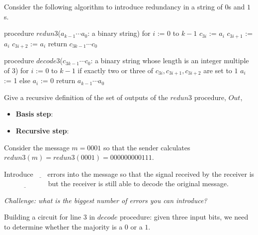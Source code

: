 \documentclass[12pt, oneside]{article}
\begin{document}
\newpage
Consider the following algorithm to introduce redundancy in a string of $0$s and $1$s.
\begin{algorithm}[caption={Create redundancy by repeating each bit three times}]
procedure $\textit{redun3}$($a_{k-1} \cdots a_0$: a binary string)
for $i$ := $0$ to $k-1$
  $c_{3i}$ := $a_i$
  $c_{3i+1}$ := $a_i$
  $c_{3i+2}$ := $a_i$
return $c_{3k-1} \cdots c_0$
\end{algorithm}

\begin{algorithm}[caption={Decode sequence of bits using majority rule on consecutive three bit sequences}]
procedure $\textit{decode3}$($c_{3k-1} \cdots c_0$: a binary string whose length is an integer multiple of $3$)
for $i$ := $0$ to $k-1$
  if exactly two or three of $c_{3i}, c_{3i+1}, c_{3i+2}$ are set to $1$
    $a_i$ := 1
  else 
    $a_i$ := 0
return $a_{k-1} \cdots a_0$
\end{algorithm}

Give a recursive definition of the set of outputs of the $redun3$ procedure, $Out$,

\vspace{-20pt}

\begin{itemize}
\item[] {\bf Basis step}: \underline{ \phantom{$\lambda \in Out$ \qquad}}
\item[] {\bf Recursive step}: \underline{\phantom{If $x \in Out$ then $x000 \in Out$ and $x111 \in Out$} }
\end{itemize}


Consider the message $m = 0001$ so that the sender calculates $redun3(m) = redun3(0001) = 000000000111$.

Introduce $\underline{\phantom{~~4~~}} $
errors into the message so that the signal received by the 
receiver is $\underline{\phantom{010100010101}}$
but the receiver is still able to decode the original message.

\vspace{-10pt}

{\it Challenge: what is the biggest number of errors you can introduce?} 

Building a circuit for line 3 in $decode$ procedure: given three input bits, we need to determine whether the
majority is a $0$ or a $1$.
\end{document}
